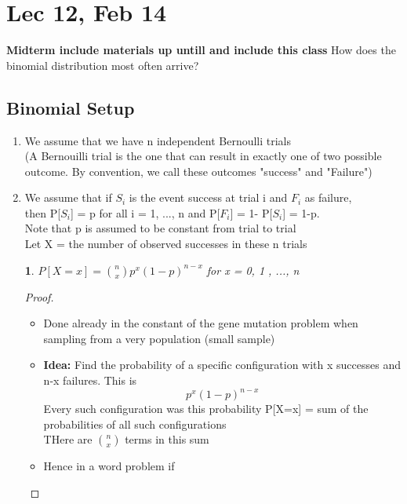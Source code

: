 \documentclass[11pt]{article}
\newtheorem{theorem}{\framebox{Thm}}[section]
\newcommand\tab[1][1cm]{\hspace*{#1}}
\begin{document}
    \section{Lec 12, Feb 14}
        \textbf{Midterm include materials up untill and include this class}
        How does the binomial distribution most often arrive? 
        \subsection{Binomial Setup}
        \begin{enumerate}
            \item We assume that we have n independent Bernoulli trials\\
                    (A Bernouilli trial is the one that can result in exactly one of two possible outcome.
                    By convention, we call these outcomes "success" and "Failure")
            \item We assume that if $S_i$ is the event success at trial i and $F_i$ as failure, \\
                    then P[$S_i$] = p for all i = 1, ..., n and P[$F_i$] =  1- P[$S_i$]  = 1-p.\\
                    Note that p is assumed to be constant from trial to trial \\
                    Let X = the number of observed successes in these n trials 
                    \begin{theorem}
                        $P[ X = x] = \binom{n}{x} p^x (1-p)^{n-x}$ for x = 0, 1 , ..., n
                    \end{theorem}
                    \begin{proof}\tab 
                        \begin{itemize}
                            \item Done already in the constant of the gene mutation problem when sampling from a very population (small sample) 
                            \item \textbf{Idea:} Find the probability of a specific configuration with x successes and n-x failures. 
                                    This is $$p^x(1-p)^{n-x}$$
                                    Every such configuration was this probability P[X=x] = sum of the probabilities of all such configurations\\
                                    THere are $\binom{n}{x}$ terms in this sum 
                            \item Hence in a word problem if 

\end{itemize}
\end{proof}
\end{enumerate}
\end{document}

